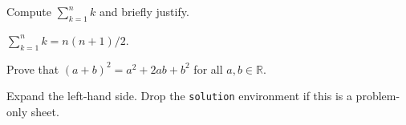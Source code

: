 \begin{problem}[10]
  Compute $\sum_{k=1}^{n} k$ and briefly justify.
\end{problem}

\begin{solution}
  $\sum_{k=1}^{n} k = n(n+1)/2$.
\end{solution}

\begin{problem}[15]
  Prove that $(a+b)^2 = a^2+2ab+b^2$ for all $a,b\in\mathbb{R}$.
\end{problem}

\begin{solution}
  Expand the left-hand side. Drop the \texttt{solution} environment if this is a problem-only sheet.
\end{solution}
